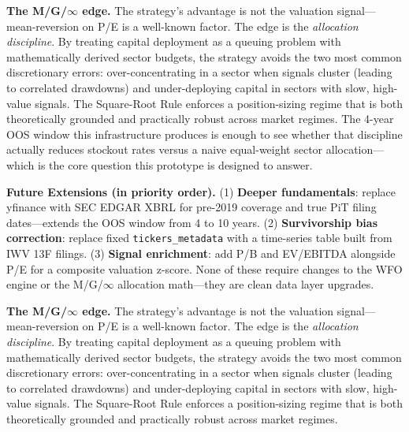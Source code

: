 \documentclass[11pt, oneside]{book}
\begin{document}
\begin{institutionbox}
\textbf{The M/G/$\infty$ edge.} The strategy's advantage is not the valuation signal---mean-reversion on P/E is a well-known factor. The edge is the \textit{allocation discipline}. By treating capital deployment as a queuing problem with mathematically derived sector budgets, the strategy avoids the two most common discretionary errors: over-concentrating in a sector when signals cluster (leading to correlated drawdowns) and under-deploying capital in sectors with slow, high-value signals. The Square-Root Rule enforces a position-sizing regime that is both theoretically grounded and practically robust across market regimes. The 4-year OOS window this infrastructure produces is enough to see whether that discipline actually reduces stockout rates versus a naive equal-weight sector allocation---which is the core question this prototype is designed to answer.
\end{institutionbox}

\begin{warningbox}
\textbf{Future Extensions (in priority order).} (1) \textbf{Deeper fundamentals}: replace yfinance with SEC EDGAR XBRL for pre-2019 coverage and true PiT filing dates---extends the OOS window from 4 to 10 years. (2) \textbf{Survivorship bias correction}: replace fixed \texttt{tickers\_metadata} with a time-series table built from IWV 13F filings. (3) \textbf{Signal enrichment}: add P/B and EV/EBITDA alongside P/E for a composite valuation z-score. None of these require changes to the WFO engine or the M/G/$\infty$ allocation math---they are clean data layer upgrades.
\end{warningbox}

\begin{institutionbox}
\textbf{The M/G/$\infty$ edge.} The strategy's advantage is not the valuation signal---mean-reversion on P/E is a well-known factor. The edge is the \textit{allocation discipline}. By treating capital deployment as a queuing problem with mathematically derived sector budgets, the strategy avoids the two most common discretionary errors: over-concentrating in a sector when signals cluster (leading to correlated drawdowns) and under-deploying capital in sectors with slow, high-value signals. The Square-Root Rule enforces a position-sizing regime that is both theoretically grounded and practically robust across market regimes.
\end{institutionbox}
\end{document}
